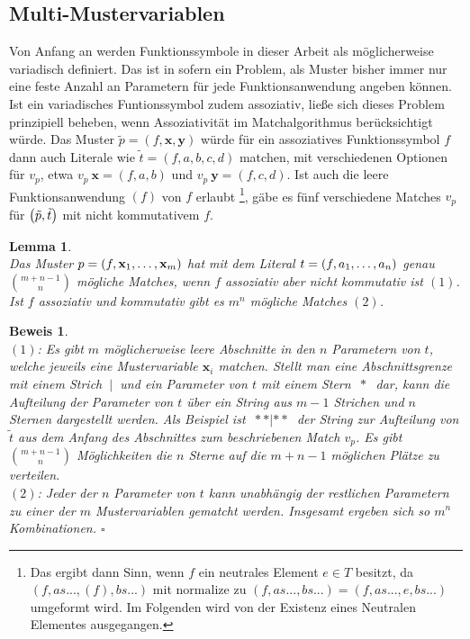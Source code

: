 \subsection{Multi-Mustervariablen} \label{subsecMulti}

Von Anfang an werden Funktionssymbole in dieser Arbeit als möglicherweise variadisch definiert. Das ist in sofern ein Problem, als Muster bisher immer nur eine feste Anzahl an Parametern für jede Funktionsanwendung angeben können. Ist ein variadisches Funtionssymbol zudem assoziativ, ließe sich dieses Problem prinzipiell beheben, wenn Assoziativität im Matchalgorithmus berücksichtigt würde. Das Muster $\tilde p = (f, \mathbf x, \mathbf y)$ würde für ein assoziatives Funktionssymbol $f$ dann auch Literale wie $\tilde t = (f, a, b, c, d)$ matchen, mit verschiedenen Optionen für $v_p$, etwa $v_p~\mathbf x = (f, a, b)$ und $v_p~\mathbf y = (f, c, d)$. Ist auch die leere Funktionsanwendung $(f)$ von $f$ erlaubt \footnote{Das ergibt dann Sinn, wenn $f$ ein neutrales Element $e \in T$ besitzt, da $(f, as..., (f), bs...)$ mit $\mathrm{normalize}$ zu $(f, as..., bs...) = (f, as..., e, bs...)$ umgeformt wird. Im Folgenden wird von der Existenz eines Neutralen Elementes ausgegangen.}, gäbe es fünf verschiedene Matches $v_p$ für $\paren*{\tilde p, \tilde t}$ mit nicht kommutativem $f$.

\newtheorem{lemNummerMatchesAC}[bsp]{Lemma}
\begin{lemNummerMatchesAC}~\\
Das Muster $p = (f, \elems {\mathbf x} 1 m)$ hat mit dem Literal $t = (f, \elems a 1 n)$ genau ${m + n - 1}\choose n$ mögliche Matches, wenn $f$ assoziativ aber nicht kommutativ ist $(1)$. Ist $f$ assoziativ und kommutativ gibt es $m^n$ mögliche Matches $(2)$.\\
\end{lemNummerMatchesAC}

\newtheorem{bewNummerMatchesAC}[bsp]{Beweis}
\begin{bewNummerMatchesAC}~\\
$(1)$: Es gibt $m$ möglicherweise leere Abschnitte in den $n$ Parametern von $t$, welche jeweils eine Mustervariable $\mathbf x_i$ matchen. Stellt man eine Abschnittsgrenze mit einem Strich $~|~$ und ein Parameter von $t$ mit einem Stern $~*~$ dar, kann die Aufteilung der Parameter von $t$ über ein String aus $m - 1$ Strichen und $n$ Sternen dargestellt werden. 
Als Beispiel ist $~**|**~$ der String zur Aufteilung von $\tilde t$ aus dem Anfang des Abschnittes zum beschriebenen Match $v_p$.
Es gibt ${m + n - 1}\choose n$ Möglichkeiten die $n$ Sterne auf die ${m + n - 1}$ möglichen Plätze zu verteilen.\\

$(2)$: Jeder der $n$ Parameter von $t$ kann unabhängig der restlichen Parametern zu einer der $m$ Mustervariablen gematcht werden. Insgesamt ergeben sich so $m^n$ Kombinationen.
\hfill $\square$\\
\end{bewNummerMatchesAC}

